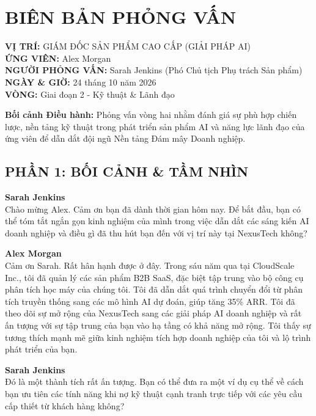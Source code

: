 \documentclass[12pt]{article}
\begin{document}
\section*{BIÊN BẢN PHỎNG VẤN}

\noindent\textbf{VỊ TRÍ:} GIÁM ĐỐC SẢN PHẨM CAO CẤP (GIẢI PHÁP AI) \\
\textbf{ỨNG VIÊN:} Alex Morgan \\
\textbf{NGƯỜI PHỎNG VẤN:} Sarah Jenkins (Phó Chủ tịch Phụ trách Sản phẩm) \\
\textbf{NGÀY \& GIỜ:} 24 tháng 10 năm 2026 \\
\textbf{VÒNG:} Giai đoạn 2 - Kỹ thuật \& Lãnh đạo

\vspace{0.5em}
\noindent\textbf{Bối cảnh Điều hành:} Phỏng vấn vòng hai nhằm đánh giá sự phù hợp chiến lược, nền tảng kỹ thuật trong phát triển sản phẩm AI và năng lực lãnh đạo của ứng viên để dẫn dắt đội ngũ Nền tảng Đám mây Doanh nghiệp.

\subsection*{PHẦN 1: BỐI CẢNH \& TẦM NHÌN}

\noindent\textbf{Sarah Jenkins} \\
Chào mừng Alex. Cảm ơn bạn đã dành thời gian hôm nay. Để bắt đầu, bạn có thể tóm tắt ngắn gọn kinh nghiệm của mình trong việc dẫn dắt các sáng kiến AI doanh nghiệp và điều gì đã thu hút bạn đến với vị trí này tại NexusTech không?

\vspace{0.5em}
\noindent\textbf{Alex Morgan} \\
Cảm ơn Sarah. Rất hân hạnh được ở đây. Trong sáu năm qua tại CloudScale Inc., tôi đã quản lý các sản phẩm B2B SaaS, đặc biệt tập trung vào bộ công cụ phân tích học máy của chúng tôi. Tôi đã dẫn dắt quá trình chuyển đổi từ phân tích truyền thống sang các mô hình AI dự đoán, giúp tăng 35\% ARR. Tôi đã theo dõi sự mở rộng của NexusTech sang các giải pháp AI doanh nghiệp và rất ấn tượng với sự tập trung của bạn vào hạ tầng có khả năng mở rộng. Tôi thấy sự tương thích mạnh mẽ giữa kinh nghiệm tích hợp doanh nghiệp của tôi và lộ trình phát triển của bạn.

\vspace{0.5em}
\noindent\textbf{Sarah Jenkins} \\
Đó là một thành tích rất ấn tượng. Bạn có thể đưa ra một ví dụ cụ thể về cách bạn ưu tiên các tính năng khi nợ kỹ thuật cạnh tranh trực tiếp với các yêu cầu cấp thiết từ khách hàng không?
\end{document}
